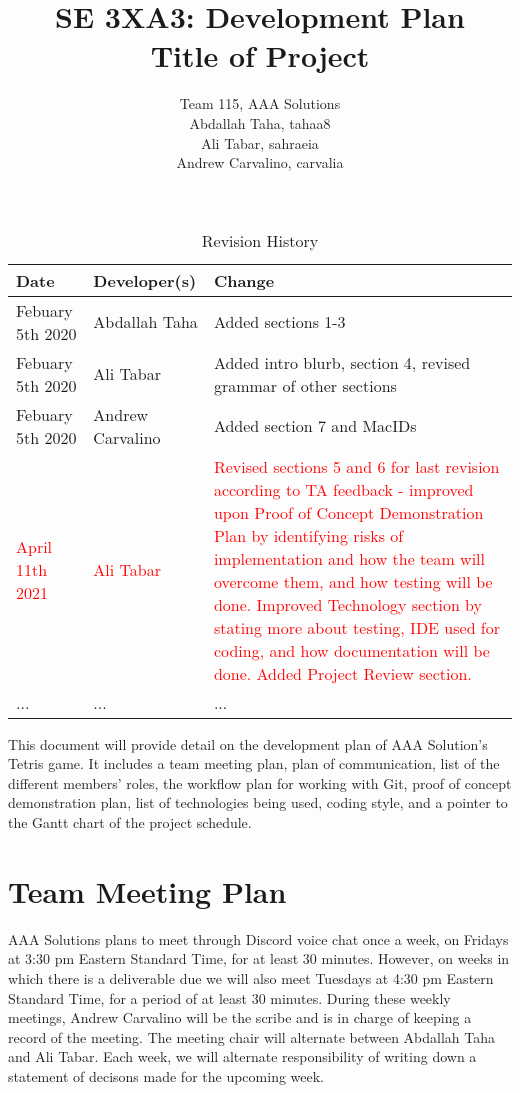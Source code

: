 \documentclass{article}
\title{SE 3XA3: Development Plan\\Title of Project}
\author{Team 115, AAA Solutions
		\\ Abdallah Taha, tahaa8
		\\ Ali Tabar, sahraeia
		\\ Andrew Carvalino, carvalia
}
\date{}
\begin{document}
\begin{table}[hp]
\caption{Revision History} \label{TblRevisionHistory}
\begin{tabularx}{\textwidth}{llX}
\toprule
\textbf{Date} & \textbf{Developer(s)} & \textbf{Change} \\
\midrule
Febuary 5th 2020 & Abdallah Taha & Added sections 1-3 \\
Febuary 5th 2020 & Ali Tabar & Added intro blurb, section 4, revised grammar of other sections \\
Febuary 5th 2020 & Andrew Carvalino & Added section 7 and MacIDs \\
\textcolor{red}{April 11th 2021} & \textcolor{red}{Ali Tabar} & \textcolor{red}{Revised sections 5 and 6 for last revision according to TA feedback - improved upon Proof of Concept Demonstration Plan by identifying risks of implementation and how the team will overcome them, and how testing will be done. Improved Technology section by stating more about testing, IDE used for coding, and how documentation will be done. Added Project Review section.}\\
... & ... & ...\\
\bottomrule
\end{tabularx}
\end{table}

\newpage

\maketitle

This document will provide detail on the development plan of AAA Solution's Tetris game. It includes a team meeting plan, plan of communication, list of the different members' roles, the workflow plan for working with Git, proof of concept demonstration plan, list of technologies being used, coding style, and a pointer to the Gantt chart of the project schedule.

\section{Team Meeting Plan}
AAA Solutions plans to meet through Discord voice chat once a week, on Fridays at 3:30 pm Eastern Standard Time, for at least 30 minutes. However, on weeks in which there is a deliverable due we will also meet Tuesdays at 4:30 pm Eastern Standard Time, for a period of at least 30 minutes. During these weekly meetings, Andrew Carvalino will be the scribe and is in charge of keeping a record of the meeting. The meeting chair will alternate between Abdallah Taha and Ali Tabar. Each week, we will alternate responsibility of writing down a statement of decisons made for the upcoming week. 
\end{document}

